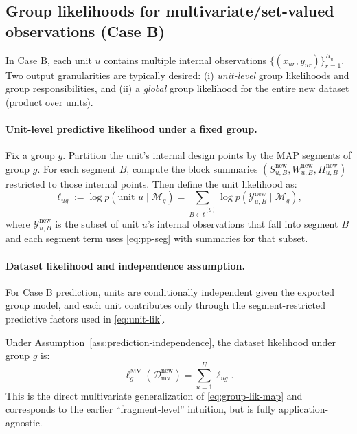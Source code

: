 \subsection{Group likelihoods for multivariate/set-valued observations (Case B)}
\label{sec:group-lik-mv}

In Case B, each unit $u$ contains multiple internal observations
$\{(x_{u r},y_{u r})\}_{r=1}^{R_u}$. Two output granularities are typically desired:
(i) \emph{unit-level} group likelihoods and group responsibilities, and (ii) a \emph{global}
group likelihood for the entire new dataset (product over units).

\paragraph{Unit-level predictive likelihood under a fixed group.}
Fix a group $g$. Partition the unit’s internal design points by the MAP segments of group $g$.
For each segment $B$, compute the block summaries $(S_{u,B}^{\text{new}},W_{u,B}^{\text{new}},H_{u,B}^{\text{new}})$
restricted to those internal points. Then define the unit likelihood as:
\begin{equation}
\ell_{u g}
:= \log p(\text{unit }u \mid \mathcal{M}_g)
= \sum_{B \in \widehat{t}^{(g)}} \log p(\mathcal{Y}^{\text{new}}_{u,B}\mid \mathcal{M}_g),
\label{eq:unit-lik}
\end{equation}
where $\mathcal{Y}^{\text{new}}_{u,B}$ is the subset of unit $u$’s internal observations that
fall into segment $B$ and each segment term uses \eqref{eq:pp-seg} with summaries for that subset.

\paragraph{Dataset likelihood and independence assumption.}
\begin{assumption}
\label{ass:prediction-independence}
For Case B prediction, units are conditionally independent given the exported group model, and each
unit contributes only through the segment-restricted predictive factors used in \eqref{eq:unit-lik}.
\end{assumption}
Under Assumption~\ref{ass:prediction-independence}, the dataset likelihood under group $g$ is:
\[
\ell_g^{\text{MV}}(\mathcal{D}^{\text{new}}_{\text{mv}})=\sum_{u=1}^{U}\ell_{u g}.
\]
This is the direct multivariate generalization of \eqref{eq:group-lik-map} and corresponds to
the earlier ``fragment-level'' intuition, but is fully application-agnostic.

